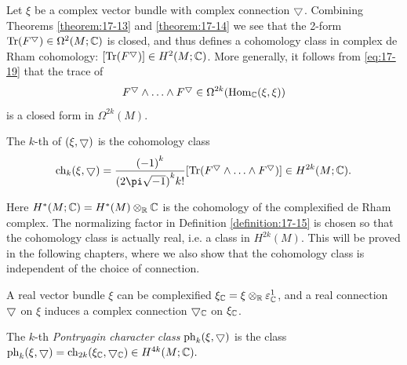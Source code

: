 Let $\xi$ be a complex vector bundle with complex connection $\bigtriangledown$. Combining Theorems \ref{theorem:17-13} 
and \ref{theorem:17-14} we see that the 2-form $\mathrm{Tr}( {F}^\bigtriangledown)\in\Omega^{2}( {M;{\mathbb{C}}})$ is closed, and thus 
defines a cohomology class in complex de Rham cohomology: $[  {\mathrm{Tr}( {F}^\bigtriangledown) }]   \in  {H}^{2}( {M;{\mathbb{C}}})$. 
More generally, it follows from \eqref{eq:17-19} that the trace of
\[
  {F}^\bigtriangledown \land  \ldots  \land  {F}^\bigtriangledown \in  \Omega^{2k}( {{\operatorname{Hom}}_{{\mathbb{C}}}( \xi, \xi) })
\]
is a closed form in $\Omega^{2k}(M)$.

\begin{definition}\label{definition:17-15}
The $k$-th  of $( {\xi, \bigtriangledown  })$ is the cohomology class
\[
  {\R{ch}}_{k}( {\xi,\btd })  
  = \frac{{(-1) }^{k}}{{( 2\pi \sqrt{-1}) }^{k}k!}[  {\R{Tr}( {{F}^\btd \land  \ldots  \land  {F}^\btd}) }]  
  \in  {H}^{2k}( {M;\CC}).
\]
\end{definition}

Here ${H}^{ * }( {M;{\mathbb{C}}})  = {H}^{ * }(M) \otimes_{\mathbb{R}}{\mathbb{C}}$ is the cohomology of the complexified de Rham complex. 
The normalizing factor in Definition \ref{definition:17-15} is chosen so that the cohomology class is actually real, i.e. a 
class in ${H}^{2k}(M)$. This will be proved in the following chapters, where we also show that the cohomology 
class is independent of the choice of connection.

A real vector bundle $\xi$ can be complexified ${\xi }_{{\mathbb{C}}} = \xi \otimes_{\mathbb{R}}{\varepsilon }_{{\mathbb{C}}}^1$, and a 
real connection $\bigtriangledown$ on $\xi$ induces a complex connection $\bigtriangledown_{{\mathbb{C}}}$ on ${\xi }_{{\mathbb{C}}}$.

\begin{definition}\label{definition:17-16}
  The $k$-th \textit{Pontryagin character class} $\mathrm{ph}_k(\xi, \bigtriangledown)$ is the 
  class $\mathrm{ph}_k(\xi, \bigtriangledown) = \mathrm{ch}_{2k}(\xi_{\mathbb{C}},\bigtriangledown_{\mathbb{C}}) \in {H}^{4k}(M;{\mathbb{C}}).$
\end{definition}

